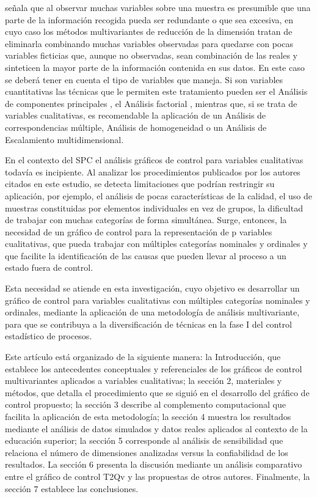 \documentclass[water,article,submit,moreauthors,pdftex]{mdpi}
\begin{document}
\citet{perez2004} señala que al observar muchas variables sobre una
muestra es presumible que una parte de la información recogida pueda ser
redundante o que sea excesiva, en cuyo caso los métodos multivariantes
de reducción de la dimensión tratan de eliminarla combinando muchas
variables observadas para quedarse con pocas variables ficticias que,
aunque no observadas, sean combinación de las reales y sinteticen la
mayor parte de la información contenida en sus datos. En este caso se
deberá tener en cuenta el tipo de variables que maneja. Si son variables
cuantitativas las técnicas que le permiten este tratamiento pueden ser
el Análisis de componentes principales
\citep{Person1901, Hotelling1933}, el Análisis factorial
\citep{ch1904, thurstone1947, kaiser1958}, mientras que, si se trata de
variables cualitativas, es recomendable la aplicación de un Análisis de
correspondencias múltiple, Análisis de homogeneidad o un Análisis de
Escalamiento multidimensional.

En el contexto del SPC el análisis gráficos de control para variables
cualitativas todavía es incipiente. Al analizar los procedimientos
publicados por los autores citados en este estudio, se detecta
limitaciones que podrían restringir su aplicación, por ejemplo, el
análisis de pocas características de la calidad, el uso de muestras
constituidas por elementos individuales en vez de grupos, la dificultad
de trabajar con muchas categorías de forma simultánea. Surge, entonces,
la necesidad de un gráfico de control para la representación de p
variables cualitativas, que pueda trabajar con múltiples categorías
nominales y ordinales y que facilite la identificación de las causas que
pueden llevar al proceso a un estado fuera de control.

Esta necesidad se atiende en esta investigación, cuyo objetivo es
desarrollar un gráfico de control para variables cualitativas con
múltiples categorías nominales y ordinales, mediante la aplicación de
una metodología de análisis multivariante, para que se contribuya a la
diversificación de técnicas en la fase I del control estadístico de
procesos.

Este artículo está organizado de la siguiente manera: la Introducción,
que establece los antecedentes conceptuales y referenciales de los
gráficos de control multivariantes aplicados a variables cualitativas;
la sección 2, materiales y métodos, que detalla el procedimiento que se
siguió en el desarrollo del gráfico de control propuesto; la sección 3
describe al complemento computacional que facilita la aplicación de esta
metodología; la sección 4 muestra los resultados mediante el análisis de
datos simulados y datos reales aplicados al contexto de la educación
superior; la sección 5 corresponde al análisis de sensibilidad que
relaciona el número de dimensiones analizadas versus la confiabilidad de
los resultados. La sección 6 presenta la discusión mediante un análisis
comparativo entre el gráfico de control T2Qv y las propuestas de otros
autores. Finalmente, la sección 7 establece las conclusiones.
\end{document}
